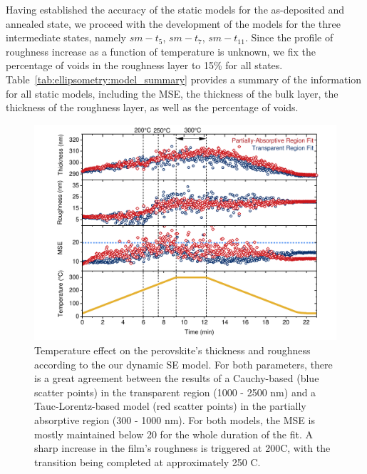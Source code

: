 Having established the accuracy of the static models for the as-deposited and annealed state, we proceed with the development of the models for the three intermediate states, namely $sm-t_5$, $sm-t_7$, $sm-t_{\text{11}}$. Since the profile of roughness increase as a function of temperature is unknown, we fix the percentage of voids in the roughness layer to 15\% for all states. Table~\ref{tab:ellipsometry:model_summary} provides a summary of the information for all static models, including the MSE, the thickness of the bulk layer, the thickness of the roughness layer, as well as the percentage of voids.


\begin{figure}[htbp]
  \centering
  \medskip
  \includegraphics[width=.99\textwidth]{chapters/ellipsometry/image/Roughness_Thickness.pdf}
  \caption{Temperature effect on the perovskite's thickness and roughness according to the our dynamic SE model. For both parameters, there is a great agreement between the results of a Cauchy-based  (blue scatter points) in the transparent region (1000 - 2500 nm) and a Tauc-Lorentz-based model (red scatter points) in the partially absorptive region (300 - 1000 nm). For both models, the MSE is mostly maintained below 20 for the whole duration of the fit. A sharp increase in the film's roughness is triggered at 200\degree C, with the transition being completed at approximately 250 \degree C.}
  \label{fig:ellipsometry:roughness_thickness}
\end{figure}


